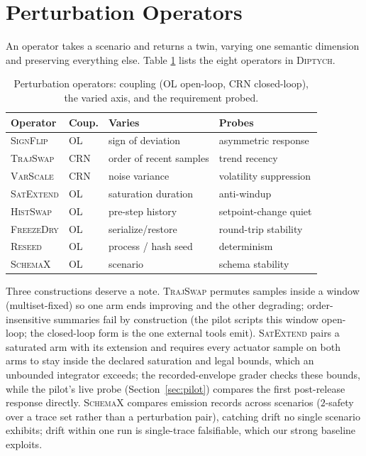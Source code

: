 \documentclass[conference]{IEEEtran}
\newcommand{\sys}{\textsc{Diptych}}
\begin{document}
	\section{Perturbation Operators}
	\label{sec:operators}
	
	An operator takes a scenario and returns a twin, varying one semantic
	dimension and preserving everything else. Table \ref{tab:ops} lists the
	eight operators in \sys{}.
	
	\begin{table}[t]
		\caption{Perturbation operators: coupling (OL open-loop, CRN
			closed-loop), the varied axis, and the requirement probed.}
		\label{tab:ops}
		\centering
		\scriptsize
		\begin{tabular}{@{}llll@{}}
			\toprule
			Operator & Coup. & Varies & Probes \\
			\midrule
			\textsc{SignFlip}  & OL  & sign of deviation & asymmetric response \\
			\textsc{TrajSwap}  & CRN & order of recent samples & trend recency \\
			\textsc{VarScale}  & CRN & noise variance & volatility suppression \\
			\textsc{SatExtend} & OL  & saturation duration & anti-windup \\
			\textsc{HistSwap}  & OL  & pre-step history & setpoint-change quiet \\
			\textsc{FreezeDry} & OL  & serialize/restore & round-trip stability \\
			\textsc{Reseed}    & OL  & process / hash seed & determinism \\
			\textsc{SchemaX}   & OL  & scenario & schema stability \\
			\bottomrule
		\end{tabular}
	\end{table}
	
	Three constructions deserve a note.
	\textsc{TrajSwap} permutes samples inside a window (multiset-fixed) so one arm
	ends improving and the other degrading; order-insensitive summaries fail by
	construction (the pilot scripts this window open-loop; the closed-loop
	form is the one external tools emit). \textsc{SatExtend} pairs a saturated arm with its
	extension and requires every actuator sample on both arms to stay inside
	the declared saturation and legal bounds, which an unbounded integrator
	exceeds; the recorded-envelope grader checks
	these bounds, while the pilot's live probe (Section~\ref{sec:pilot})
	compares the first post-release response directly.
	\textsc{SchemaX} compares emission records across scenarios ($2$-safety
	over a trace set rather than a perturbation pair), catching drift no
	single scenario exhibits; drift within one run is single-trace
	falsifiable, which our strong baseline exploits.
	
\end{document}
